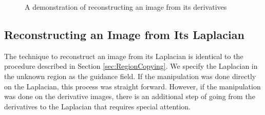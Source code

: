 \documentclass{InsightArticle}
\begin{document}
\begin{figure}[H]
\centering
{}
\caption{A demonstration of reconstructing an image from its derivatives}
\label{fig:DerivativeReconstruction}
\end{figure}

\subsection{Reconstructing an Image from Its Laplacian}
\label{sec:ReconstructingFromLaplacian}
The technique to reconstruct an image from its Laplacian is identical to the procedure described in Section \ref{sec:RegionCopying}. We specify the Laplacian in the unknown region as the guidance field. If the manipulation was done directly on the Laplacian, this process was straight forward. However, if the manipulation was done on the derivative images, there is an additional step of going from the derivatives to the Laplacian that requires special attention.
\end{document}
